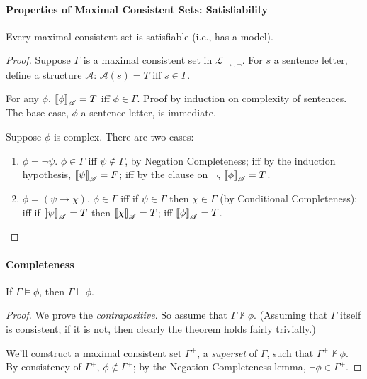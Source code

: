 {\paragraph{Properties of Maximal Consistent Sets: Satisfiability}

\begin{theorem}
	Every maximal consistent set is satisfiable (i.e., has a model).\begin{proof}
	{	Suppose $\Gamma$ is a maximal consistent set in $\mathcal{L}_{\to,\neg}$. For $s$ a sentence letter, define a structure $\mathscr{A}$: {$\mathscr{A}(s) = T$ iff $s\in\Gamma$}.
			
			For any $\phi$, $\left\llbracket \phi\right\rrbracket_{\mathscr{A}}=T$ iff $\phi\in\Gamma$. Proof by induction on complexity of sentences. The base case, $\phi$ a sentence letter, is immediate. 
		
	Suppose $\phi$ is complex. There are two cases: \begin{enumerate}
		\item $\phi=\neg\psi$. $\phi\in\Gamma$ iff $\psi\notin\Gamma$, by Negation Completeness; iff by the induction hypothesis, $\left\llbracket \psi\right\rrbracket_{\mathscr{A}}=F$; iff by the clause on $\neg$, $\left\llbracket \phi\right\rrbracket_{\mathscr{A}}=T$.
		\item $\phi=(\psi\to\chi)$. $\phi\in\Gamma$ iff if $\psi\in\Gamma$ then $\chi\in\Gamma$ (by Conditional Completeness); iff if $\left\llbracket \psi\right\rrbracket_{\mathscr{A}}=T$ then $\left\llbracket \chi\right\rrbracket_{\mathscr{A}}=T$; iff $\left\llbracket \phi\right\rrbracket_{\mathscr{A}}=T$.
	\end{enumerate} }\end{proof}
\end{theorem} 

\paragraph{Completeness}

\begin{theorem}
	If $\Gamma\vDash\phi$, then $\Gamma\vdash\phi$. \begin{proof}
		{ We prove the \emph{contrapositive}. So assume that $\Gamma\not\vdash\phi$. (Assuming that $\Gamma$ itself is consistent; if it is not, then clearly the theorem holds fairly trivially.)
		
		We'll construct a maximal consistent set $\Gamma^{+}$, a \emph{superset} of $\Gamma$, such that $\Gamma^{+}\not\vdash\phi$.  By consistency of $\Gamma^{+}$, $\phi\notin\Gamma^{+}$; by the Negation Completeness lemma, $\neg\phi\in\Gamma^{+}$.
		
}
\end{proof}
\end{theorem}}

